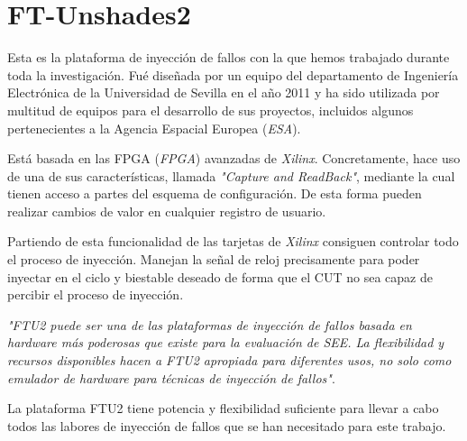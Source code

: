 \section{FT-Unshades2}
\label{sec:FT-Unshades2}
Esta es la plataforma de inyección de fallos con la que hemos trabajado durante
toda la investigación. Fué diseñada por un equipo del departamento de Ingeniería
Electrónica de la Universidad de Sevilla en el año 2011 \cite{FTU} y ha sido
utilizada por multitud de equipos para el desarrollo de sus proyectos, incluidos
algunos pertenecientes a la Agencia Espacial Europea (\textit{\acrshort{ESA}}).

Está basada en las \acrshort{FPGA} (\textit{\acrlong{FPGA}}) avanzadas de
\textit{Xilinx}. Concretamente, hace uso de una de sus características, llamada
\textit{"Capture and ReadBack"}, mediante la cual tienen acceso a partes del
esquema de configuración. De esta forma pueden realizar cambios de valor en 
cualquier registro de usuario.

Partiendo de esta funcionalidad de las tarjetas de \textit{Xilinx} consiguen
controlar todo el proceso de inyección. Manejan la señal de reloj precisamente
para poder inyectar en el ciclo y biestable deseado de forma que el \gls{CUT} no
sea capaz de percibir el proceso de inyección.

\vspace{0.3cm}
\textit{"FTU2 puede ser una de las plataformas de inyección de fallos basada en 
hardware más poderosas que existe para la evaluación de \gls{SEE}. La flexibilidad
y recursos disponibles hacen a FTU2 apropiada para diferentes usos, no solo como
emulador de hardware para técnicas de inyección de fallos"}.
\vspace{-0.2cm}
{}
\vspace{0.3cm}

La plataforma FTU2 tiene potencia y flexibilidad suficiente para llevar a cabo
todos las labores de inyección de fallos que se han necesitado para este trabajo.

\endinput
